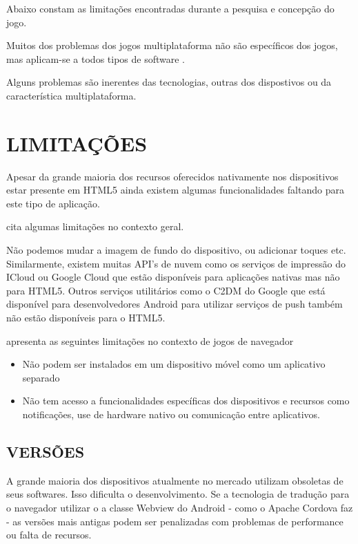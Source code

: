 \begin{draft}
Abaixo constam as limitações encontradas durante a pesquisa e concepção do jogo.


Muitos dos problemas dos jogos multiplataforma não são específicos
dos jogos, mas aplicam-se a todos tipos de software  \parencite{currentStateCrossPlatform}.


Alguns problemas são inerentes das tecnologias, outras dos dispostivos ou da característica multiplataforma.

\section{LIMITAÇÕES}

Apesar da grande maioria dos recursos oferecidos nativamente nos dispositivos estar presente
em HTML5 ainda existem algumas funcionalidades faltando para este tipo
de aplicação.

\cite{html5Tradeoffs} cita algumas limitações no contexto geral.

Não podemos mudar a imagem de fundo do
dispositivo, ou adicionar toques etc. Similarmente, existem muitas
API's de nuvem como os serviços de impressão do ICloud ou Google
Cloud que estão disponíveis para aplicações nativas mas não para
HTML5. Outros serviços utilitários como o C2DM do Google que está
disponível para desenvolvedores Android para utilizar serviços de push
também não estão disponíveis para o HTML5.

\cite{browserGamesTechnologyAndFuture} apresenta as seguintes limitações 
no contexto de jogos de navegador

\begin{itemize}
\item Não podem ser instalados em um dispositivo móvel como um aplicativo separado
\item Não tem acesso a funcionalidades específicas dos dispositivos e recursos como notificações, use de hardware nativo ou comunicação entre aplicativos.
\end{itemize}


\subsection{VERSÕES}
A grande maioria dos dispositivos atualmente no mercado utilizam
obsoletas de seus softwares. Isso dificulta o desenvolvimento. Se a
tecnologia de tradução para o navegador utilizar o a classe Webview do
Android - como o Apache Cordova faz - as versões mais antigas podem ser
penalizadas com problemas de performance ou falta de recursos.



\end{draft}
